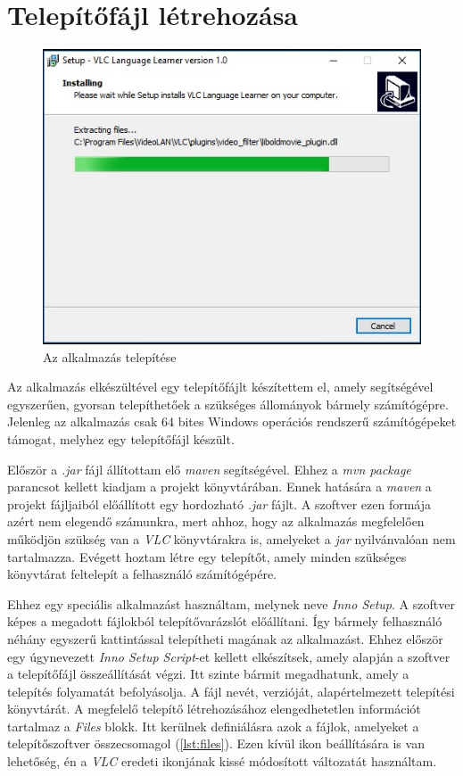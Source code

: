 \section{Telepítőfájl létrehozása}

\begin{figure}
\centering
  \includegraphics[width=.7\linewidth]{images/installer.jpg}
  \caption{Az alkalmazás telepítése}
  \label{fig:installer}
\end{figure}


Az alkalmazás elkészültével egy telepítőfájlt készítettem el, amely segítségével egyszerűen, gyorsan telepíthetőek a szükséges állományok bármely számítógépre. Jelenleg az alkalmazás csak 64 bites Windows operációs rendszerű számítógépeket támogat, melyhez egy telepítőfájl készült.

Először a \textit{.jar} fájl állítottam elő \textit{maven} segítségével. Ehhez a \textit{mvn package} parancsot kellett kiadjam a projekt könyvtárában. Ennek hatására a \textit{maven} a projekt fájljaiból előállított egy hordozható \textit{.jar} fájlt. A szoftver ezen formája azért nem elegendő számunkra, mert ahhoz, hogy az alkalmazás megfelelően működjön szükség van a \textit{VLC} könyvtárakra is, amelyeket a \textit{jar} nyilvánvalóan nem tartalmazza. Evégett hoztam létre egy telepítőt, amely minden szükséges könyvtárat feltelepít a felhasználó számítógépére.

Ehhez egy speciális alkalmazást használtam, melynek neve \textit{Inno Setup}. A szoftver képes a megadott fájlokból telepítővarázslót előállítani. Így bármely felhasználó néhány egyszerű kattintással telepítheti magának az alkalmazást. Ehhez először egy úgynevezett \textit{Inno Setup Script}-et kellett elkészítsek, amely alapján a szoftver a telepítőfájl összeállítását végzi. Itt szinte bármit megadhatunk, amely a telepítés folyamatát befolyásolja. A fájl nevét, verzióját, alapértelmezett telepítési könyvtárát. A megfelelő telepítő létrehozásához elengedhetetlen információt tartalmaz a \textit{Files} blokk. Itt kerülnek definiálásra azok a fájlok, amelyeket a telepítőszoftver összecsomagol (\ref{lst:files}). Ezen kívül ikon beállítására is van lehetőség, én a \textit{VLC} eredeti ikonjának kissé módosított változatát használtam.

